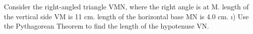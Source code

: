 \documentclass[preview]{standalone}
\begin{document}
\begin{center}
\begin{minipage}{12cm}\raggedright Consider the right-angled triangle VMN, where the right angle is at M. \The length of the vertical side VM is 11 cm. \The length of the horizontal base MN is 4.0 cm. \i) Use the Pythagorean Theorem to find the length of the hypotenuse VN.\end{minipage}
\end{center}
\end{document}
